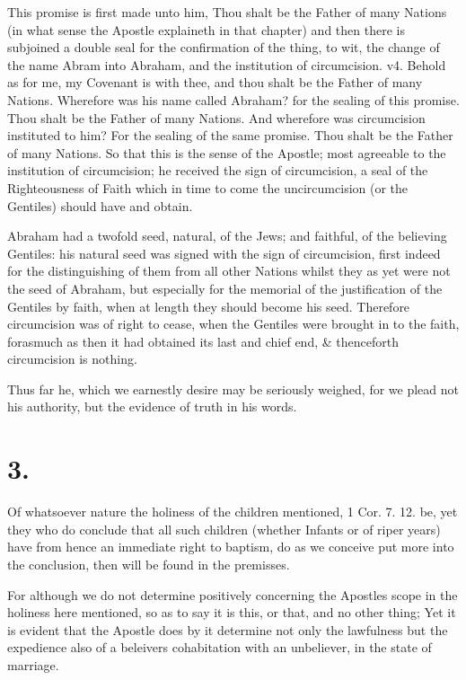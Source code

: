\documentclass[12pt,a4paper]{book}
\begin{document}
This promise is first made unto him, Thou shalt be the Father of many Nations (in what sense the Apostle explaineth in that chapter) and then there is subjoined a double seal for the confirmation of the thing, to wit, the change of the name Abram into Abraham, and the institution of circumcision. v4. Behold as for me, my Covenant is with thee, and thou shalt be the Father of many Nations. Wherefore was his name called Abraham? for the sealing of this promise. Thou shalt be the Father of many Nations. And wherefore was circumcision instituted to him? For the sealing of the same promise. Thou shalt be the Father of many Nations. So that this is the sense of the Apostle; most agreeable to the institution of circumcision; he received the sign of circumcision, a seal of the Righteousness of Faith which in time to come the uncircumcision (or the Gentiles) should have and obtain.

Abraham had a twofold seed, natural, of the Jews; and faithful, of the believing Gentiles: his natural seed was signed with the sign of circumcision, first indeed for the distinguishing of them from all other Nations whilst they as yet were not the seed of Abraham, but especially for the memorial of the justification of the Gentiles by faith, when at length they should become his seed. Therefore circumcision was of right to cease, when the Gentiles were brought in to the faith, forasmuch as then it had obtained its last and chief end, \& thenceforth circumcision is nothing.

Thus far he, which we earnestly desire may be seriously weighed, for we plead not his authority, but the evidence of truth in his words.

\section*{3.}
Of whatsoever nature the holiness of the children mentioned, 1 Cor. 7. 12. be, yet they who do conclude that all such children (whether Infants or of riper years) have from hence an immediate right to baptism, do as we conceive put more into the conclusion, then will be found in the premisses.

For although we do not determine positively concerning the Apostles scope in the holiness here mentioned, so as to say it is this, or that, and no other thing; Yet it is evident that the Apostle does by it determine not only the lawfulness but the expedience also of a beleivers cohabitation with an unbeliever, in the state of marriage.
\end{document}
